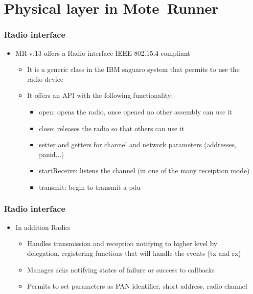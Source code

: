 \section{Physical layer in \mbox{Mote Runner}}
\begin{frame}[fragile]
  \frametitle{Radio interface}
  \begin{itemize}
    \item MR v.13 offers a Radio interface IEEE 802.15.4 compliant
    \begin{itemize}
    	\item It is a generic class in the IBM saguaro system that permits to use the radio device
    	\item It offers an API with the following functionality:
    	\begin{itemize}
			\item open: opens the radio, once opened no other assembly can use it
			\item close: releases the radio so that others can use it
			\item setter and getters for channel and network parameters (addresses, panid...)
			\item startReceive: listens the channel (in one of the many receiption mode)
			\item transmit: begin to transmit a pdu
    	\end{itemize}
    \end{itemize}
  \end{itemize}
\end{frame}

\begin{frame}[fragile]
	\frametitle{Radio interface}
	\begin{itemize}
		\item In addition Radio:
		\begin{itemize}
			\item Handles transmission and reception notifying to higher level by delegation, registering functions that will handle the events (tx and rx)
			\item Manages acks notifying states of failure or success to callbacks
			\item Permits to set parameters as PAN identifier, short address, radio channel
		\end{itemize}
	\end{itemize}
\end{frame}


